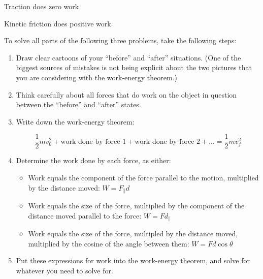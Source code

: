 \documentclass[12pt]{article}
\begin{document}
\vspace{1.2in}


\begin{minipage}{0.5\textwidth}	
		\begin{center}
	Traction does zero work
		\end{center}
\end{minipage}
\begin{minipage}{0.5\textwidth}	
	\begin{center}
		Kinetic friction does positive work 
	\end{center}
\end{minipage}




\newpage

To solve all parts of the following three problems, take the following steps:

\begin{enumerate}
	\item Draw clear cartoons of your ``before'' and ``after'' situations. (One of the biggest sources of mistakes is not being explicit about the two pictures that you are considering with the work-energy theorem.)
	\item Think carefully about all forces that do work on the object in question between the ``before'' and ``after'' states.
	\item Write down the work-energy theorem:
	
	$$\frac{1}{2}mv_0^2 + \text{work done by force 1} + \text{work done by force 2} + ... = \frac{1}{2}mv_f^2$$
	
	\item Determine the work done by each force, as either:
	\begin{itemize}
		\item Work equals the component of the force parallel to the motion, multiplied by the distance moved: $W = F_\parallel d$
		\item Work equals the size of the force, multiplied by the component of the distance moved parallel to the force: $W = F d_\parallel$
		\item Work equals the size of the force, multipled by the distance moved, multiplied by the cosine of the angle between them: $W = F d \cos \theta$
	\end{itemize}
	
	\item Put these expressions for work into the work-energy theorem, and solve for whatever you need to solve for.
\end{enumerate}
\end{document}

